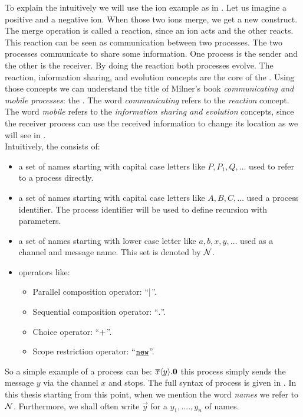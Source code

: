 To explain the \picalc{} intuitively we will use the ion example as in \cite{milner}. Let us imagine a positive and a negative ion. When those two ions merge, we get a new construct. The merge operation is called a reaction, since an ion acts and the other reacts. This reaction can be seen as communication between two processes. The two processes communicate to share some information.  One process is the sender and the other is the receiver. By doing the reaction both processes evolve. The reaction, information sharing, and evolution concepts are the core of the \picalc{}. Using those concepts we can understand the title of Milner's book \textit{communicating and mobile processes}: the \picalc{} \cite{milner}. The word \textit{communicating} refers to the \textit{reaction} concept. The word \textit{mobile} refers to the \textit{information sharing and evolution} concepts, since the receiver process can use the received information to change its location as we will see in .
\\Intuitively, the \picalc{} consists of: 
\begin{itemize}
\item a set of names starting with capital case letters  like $P, P_1, Q,\dots$  used to refer to a process directly.
\item a set of names starting with capital case letters  like $A, B, C,\dots$  used a process identifier. The process identifier will be used to define recursion with parameters.
\item a set of names starting with lower case letter like $a, b, x, y,\dots$  used as a channel and message name. This set is denoted by $\mathcal N$.
\item operators like:
	\begin{itemize}
	\item  Parallel composition operator: ``$\mid$''.
	\item  Sequential composition operator: ``$.$''.
	\item  Choice operator: ``$+$''.
	\item  Scope restriction operator: ``$\procres{}{}$''.
	\end{itemize}
\end{itemize}
So a simple example of a process can be: $\overline{x}\langle y\rangle.\mathbf{0}$ this process simply sends the message $y$ via the channel $x$ and stops.
The full syntax of \picalc{} process is given in . In this thesis starting from this point, when we mention the word \textit{names} we refer to $\mathcal N$. Furthermore, we shall often write $\vec{y}$ for a  $y_1,....,y_n$ of names.

